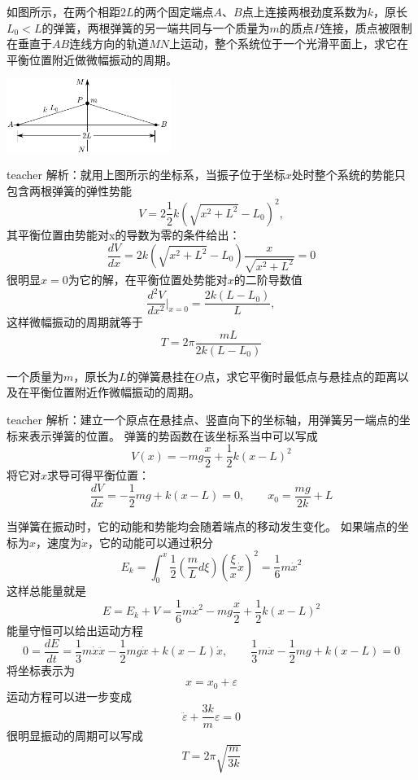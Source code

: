 \begin{example}
如图所示，在两个相距$2L$的两个固定端点$A、B$点上连接两根劲度系数为$k$，原长$L_0<L$的弹簧，两根弹簧的另一端共同与一个质量为$m$的质点$P$连接，质点被限制在垂直于$AB$连线方向的轨道$MN$上运动，整个系统位于一个光滑平面上，求它在平衡位置附近做微幅振动的周期。
\begin{flushright}
\includegraphics[width = 0.4\textwidth]{images/ow-two-springs-oscillation.pdf} 
\end{flushright}
\begin{taggedblock}{teacher}
\noindent
解析：就用上图所示的坐标系，当振子位于坐标$x$处时整个系统的势能只包含两根弹簧的弹性势能
\[V = 2\frac{1}{2}k(\sqrt{x^2+L^2}-L_0)^2,\]
其平衡位置由势能对x的导数为零的条件给出：
\[
\frac{dV}{dx} = 2k(\sqrt{x^2+L^2}-L_0)\frac{x}{\sqrt{x^2+L^2}}=0
\]
很明显$x=0$为它的解，在平衡位置处势能对$x$的二阶导数值
\[
\frac{d^2V}{dx^2}\bigg|_{x=0} = \frac{2k(L-L_0)}{L},
\]
这样微幅振动的周期就等于
\[
T = 2\pi\frac{mL}{2k(L-L_0)}
\]
\end{taggedblock}
\end{example}

\begin{example}
一个质量为$m$，原长为$L$的弹簧悬挂在$O$点，求它平衡时最低点与悬挂点的距离以及在平衡位置附近作微幅振动的周期。

\begin{taggedblock}{teacher}
\noindent
解析：建立一个原点在悬挂点、竖直向下的坐标轴，用弹簧另一端点的坐标来表示弹簧的位置。
弹簧的势函数在该坐标系当中可以写成
\[
V(x) = -mg\frac{x}{2}+\frac{1}{2}k(x-L)^2
\]
将它对$x$求导可得平衡位置：
\[
\frac{dV}{dx} = -\frac{1}{2}mg+k(x-L)=0,\qquad x_0 = \frac{mg}{2k}+L
\]

当弹簧在振动时，它的动能和势能均会随着端点的移动发生变化。
如果端点的坐标为$x$，速度为$\dot{x}$，它的动能可以通过积分
\[
E_k = \int_0^x \frac{1}{2}(\frac{m}{L}d\xi)(\frac{\xi}{x}\dot{x})^2 = \frac{1}{6}m\dot{x}^2
\]
这样总能量就是
\[
E = E_k+V = \frac{1}{6}m\dot{x}^2-mg\frac{x}{2}+\frac{1}{2}k(x-L)^2
\]
能量守恒可以给出运动方程
\[
0=\frac{dE}{dt} = \frac{1}{3}m\dot{x}\ddot{x}-\frac{1}{2}mg\dot{x}+k(x-L)\dot{x},\qquad \frac{1}{3}m\ddot{x}-\frac{1}{2}mg+k(x-L)=0
\]
将坐标表示为
\[
x = x_0+\varepsilon
\]
运动方程可以进一步变成
\[
\ddot{\varepsilon} +\frac{3k}{m} \varepsilon = 0
\]
很明显振动的周期可以写成
\[
T = 2\pi\sqrt{\frac{m}{3k}}
\]

\end{taggedblock}
\end{example}

